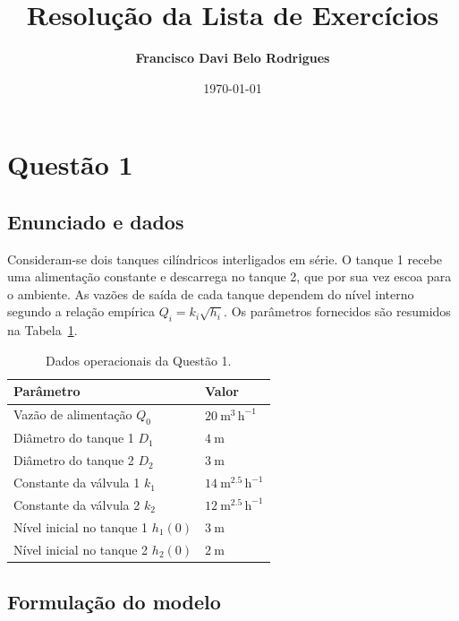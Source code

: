 \documentclass{article}
\title{Resolução da Lista de Exercícios}
\author{\textbf{Francisco Davi Belo Rodrigues}}
\date{\today}
\begin{document}
\fancyhead{}

\maketitle
\thispagestyle{fancy}

\section*{Questão 1}

\subsection*{Enunciado e dados}
Consideram-se dois tanques cilíndricos interligados em série. O tanque 1 recebe uma alimentação constante e descarrega no tanque 2, que por sua vez escoa para o ambiente. As vazões de saída de cada tanque dependem do nível interno segundo a relação empírica $Q_i = k_i\sqrt{h_i}$. Os parâmetros fornecidos são resumidos na Tabela~\ref{tab:dados-q1}.

\begin{table}[ht]
  \centering
  \begin{tabular}{ll}
    \hline
    \textbf{Parâmetro} & \textbf{Valor} \\
    \hline
    Vazão de alimentação $Q_0$ & $20\ \mathrm{m^3\,h^{-1}}$ \\
    Diâmetro do tanque 1 $D_1$ & $4\ \mathrm{m}$ \\
    Diâmetro do tanque 2 $D_2$ & $3\ \mathrm{m}$ \\
    Constante da válvula 1 $k_1$ & $14\ \mathrm{m^{2.5}\,h^{-1}}$ \\
    Constante da válvula 2 $k_2$ & $12\ \mathrm{m^{2.5}\,h^{-1}}$ \\
    Nível inicial no tanque 1 $h_1(0)$ & $3\ \mathrm{m}$ \\
    Nível inicial no tanque 2 $h_2(0)$ & $2\ \mathrm{m}$ \\
    \hline
  \end{tabular}
  \caption{Dados operacionais da Questão 1.}
  \label{tab:dados-q1}
\end{table}

\subsection*{Formulação do modelo}
\end{document}
